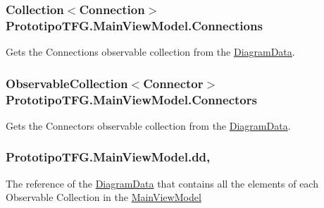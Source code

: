 \subsubsection[{Connections}]{\setlength{\rightskip}{0pt plus 5cm}Collection$<${\bf Connection}$>$ Prototipo\+T\+F\+G.\+Main\+View\+Model.\+Connections\hspace{0.3cm}{\ttfamily [get]}}\label{class_prototipo_t_f_g_1_1_main_view_model_a6aa57a570df94d6ba318e8d9a30bc96a}


Gets the Connections observable collection from the \hyperlink{class_prototipo_t_f_g_1_1_diagram_data}{Diagram\+Data}. 

\hypertarget{class_prototipo_t_f_g_1_1_main_view_model_ab1c19d68d9523215515c53fceb005077}{}
\subsubsection[{Connectors}]{\setlength{\rightskip}{0pt plus 5cm}Observable\+Collection$<${\bf Connector}$>$ Prototipo\+T\+F\+G.\+Main\+View\+Model.\+Connectors\hspace{0.3cm}{\ttfamily [get]}}\label{class_prototipo_t_f_g_1_1_main_view_model_ab1c19d68d9523215515c53fceb005077}


Gets the Connectors observable collection from the \hyperlink{class_prototipo_t_f_g_1_1_diagram_data}{Diagram\+Data}. 

\hypertarget{class_prototipo_t_f_g_1_1_main_view_model_a648a8ec23b44d0e05f6d265710d07432}{}
\subsubsection[{dd}]{ Prototipo\+T\+F\+G.\+Main\+View\+Model.\+dd\hspace{0.3cm}{\ttfamily [get]}, {\ttfamily [set]}}\label{class_prototipo_t_f_g_1_1_main_view_model_a648a8ec23b44d0e05f6d265710d07432}


The reference of the \hyperlink{class_prototipo_t_f_g_1_1_diagram_data}{Diagram\+Data} that contains all the elements of each Observable Collection in the \hyperlink{class_prototipo_t_f_g_1_1_main_view_model}{Main\+View\+Model} 

